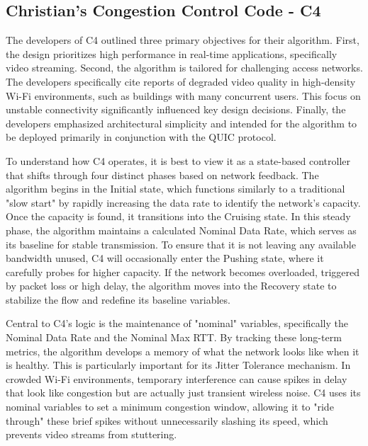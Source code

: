 \subsection{Christian's Congestion Control Code - C4}

The developers of C4 outlined three primary objectives for their algorithm\cite{C4BlogPost}. 
First, the design prioritizes high performance in real-time applications, specifically video streaming\cite{C4BlogPost}. 
Second, the algorithm is tailored for challenging access networks\cite{C4BlogPost}.
The developers specifically cite reports of degraded video quality in high-density Wi-Fi environments, such as buildings with many concurrent users\cite{C4BlogPost}. 
This focus on unstable connectivity significantly influenced key design decisions\cite{C4BlogPost}. 
Finally, the developers emphasized architectural simplicity and intended for the algorithm to be deployed primarily in conjunction with the QUIC protocol\cite{C4BlogPost}.

To understand how C4 operates, it is best to view it as a state-based controller that shifts through four distinct phases based on network feedback\cite{C4}. 
The algorithm begins in the Initial state, which functions similarly to a traditional "slow start" by rapidly increasing the data rate to identify the network's capacity\cite{C4}. 
Once the capacity is found, it transitions into the Cruising state. In this steady phase, the algorithm maintains a calculated Nominal Data Rate, which serves as its baseline for stable transmission\cite{C4}. 
To ensure that it is not leaving any available bandwidth unused, C4 will occasionally enter the Pushing state, where it carefully probes for higher capacity\cite{C4}. 
If the network becomes overloaded, triggered by packet loss or high delay, the algorithm moves into the Recovery state to stabilize the flow and redefine its baseline variables\cite{C4}.

Central to C4’s logic is the maintenance of "nominal" variables, specifically the Nominal Data Rate and the Nominal Max RTT\cite{C4}. 
By tracking these long-term metrics, the algorithm develops a memory of what the network looks like when it is healthy\cite{C4}. 
This is particularly important for its Jitter Tolerance mechanism\cite{C4}. 
In crowded Wi-Fi environments, temporary interference can cause spikes in delay that look like congestion but are actually just transient wireless noise\cite{C4}.
C4 uses its nominal variables to set a minimum congestion window, allowing it to "ride through" these brief spikes without unnecessarily slashing its speed, which prevents video streams from stuttering\cite{C4}.

